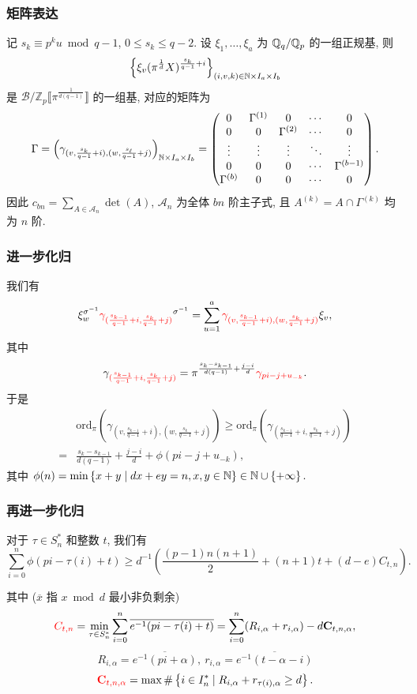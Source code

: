 \documentclass{beamer}
\newcommand\ov{\overline}
\newcommand\ldb{\llbracket}
\newcommand\rdb{\rrbracket}
\newcommand\set[1]{\left\{#1\right\}}
\newcommand\BZ{{\mathbb{Z}}}
\newcommand\CA{{\mathcal{A}}} \newcommand\CB{{\mathcal{B}}} \newcommand\CC{{\mathcal{C}}}\providecommand\CD{{\mathcal{D}}}\newcommand\CE{{\mathcal{E}}}
\newcommand\ord{{\mathrm{ord}}}
\begin{document}
\begin{frame}
\frametitle{矩阵表达}
记 $s_k\equiv p^k u\bmod{q-1}$, $0\le s_k\le q-2$.
设 $\xi_1,\dots,\xi_a$ 为 ${\mathbb{Q}}_q/{\mathbb{Q}}_p$ 的一组正规基, 则
	\[\set{\xi_v(\pi^{\frac1d}X)^{\frac{s_k}{q-1}+i}}_{(i,v,k)\in\BN\times I_a\times I_b}\]
是 $\CB/\BZ_p\ldb\pi^{\frac{1}{d(q-1)}}\rdb$ 的一组基, 对应的矩阵为
	\[
	\Gamma=\left(\gamma_{(v,\frac{s_k}{q-1}+i),(w,\frac{s_\ell}{q-1}+j)}\right)_{{\mathbb{N}}\times I_a\times I_b}=\begin{pmatrix}
		0&\Gamma^{(1)}&0&\cdots&0\\
		0&0&\Gamma^{(2)}&\cdots&0\\
		\vdots&\vdots&\vdots&\ddots&\vdots\\
		0&0&0&\cdots&\Gamma^{(b-1)}\\
		\Gamma^{(b)}&0&0&\cdots&0
	\end{pmatrix}.
	\]
因此 $c_{bn}=\sum_{A\in\CA_n} \det(A)$, $\CA_n$ 为全体 $bn$ 阶主子式, 且 $A^{(k)}=A\cap \Gamma^{(k)}$ 均为 $n$ 阶.
\end{frame}

\begin{frame}
\frametitle{进一步化归}
我们有
\vspace{-2mm}
	\[\xi_w^{\sigma^{-1}}{\color{red}{\gamma_{(\frac{s_{k-1}}{q-1}+i,\frac{s_k}{q-1}+j)}}}^{\sigma^{-1}}=\sum_{u=1}^a {\color{red}{\gamma_{(v,\frac{s_{k-1}}{q-1}+i),(w,\frac{s_k}{q-1}+j)}}}\xi_v,\]
\vspace{-2mm}
其中
\vspace{-2mm}
	\[\gamma_{\color{red}{(\frac{s_{k-1}}{q-1}+i,\frac{s_k}{q-1}+j)}}
	=\pi^{\frac{s_k-s_{k-1}}{d(q-1)}+\frac{j-i}{d}}{\color{red}{\gamma_{pi-j+u_{-k}}}}.\]
于是
	\[
	\begin{split}
	&\ord_\pi\left(\gamma_{(v,\frac{s_{k-1}}{q-1}+i),(w,\frac{s_k}{q-1}+j)}\right)\ge \ord_\pi\left(\gamma_{(\frac{s_{k-1}}{q-1}+i,\frac{s_k}{q-1}+j)}\right)\\
	=&\frac{s_k-s_{k-1}}{d(q-1)}+\frac{j-i}{d}+\phi(pi-j+u_{-k}),
	\end{split}
	\]
其中 $\phi(n)=\min\set{x+y\mid dx+ey=n,x,y\in\BN}\in\BN\cup\set{+\infty}.$
\end{frame}

\begin{frame}
\frametitle{再进一步化归}

\begin{lemma}[主子式赋值]
对于 $\tau\in S_n^*$ 和整数 $t$, 我们有
	\[\sum_{i=0}^n \phi(pi-\tau(i)+t)\ge d^{-1}\left(\frac{(p-1)n(n+1)}2+(n+1)t+(d-e)C_{t,n}\right).\]
\end{lemma}
其中 ($\ov x$ 指 $x\bmod d$ 最小非负剩余)
	\[{\color{red}{C_{t,n}}}=\min_{\tau\in S_n^*} \sum_{i=0}^n \ov{e^{-1}(pi-\tau(i)+t)}=\sum_{i=0}^n(R_{i,\alpha}+r_{i,\alpha})-d \bfC_{t,n,\alpha},\]
	\[R_{i,\alpha}=\ov{e^{-1}(pi+\alpha)},\ r_{i,\alpha}=\ov{e^{-1}(t-\alpha-i)}\]
	\[{\color{red}{\bfC_{t,n,\alpha}}}=\max\#\set{i\in I_n^*\mid R_{i,\alpha}+r_{\tau(i),\alpha}\ge d}.\]
\end{frame}
\end{document}
